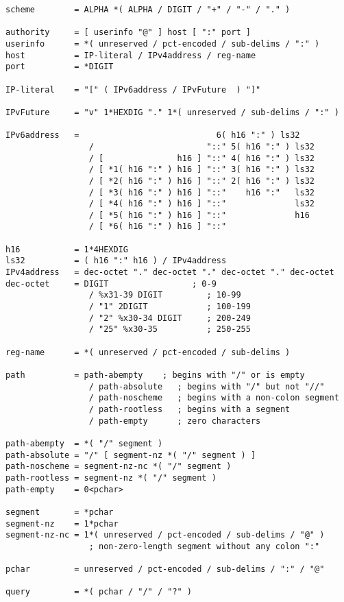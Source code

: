 \begin{verbatim}
scheme        = ALPHA *( ALPHA / DIGIT / "+" / "-" / "." )

authority     = [ userinfo "@" ] host [ ":" port ]
userinfo      = *( unreserved / pct-encoded / sub-delims / ":" )
host          = IP-literal / IPv4address / reg-name
port          = *DIGIT

IP-literal    = "[" ( IPv6address / IPvFuture  ) "]"

IPvFuture     = "v" 1*HEXDIG "." 1*( unreserved / sub-delims / ":" )

IPv6address   =                            6( h16 ":" ) ls32
                 /                       "::" 5( h16 ":" ) ls32
                 / [               h16 ] "::" 4( h16 ":" ) ls32
                 / [ *1( h16 ":" ) h16 ] "::" 3( h16 ":" ) ls32
                 / [ *2( h16 ":" ) h16 ] "::" 2( h16 ":" ) ls32
                 / [ *3( h16 ":" ) h16 ] "::"    h16 ":"   ls32
                 / [ *4( h16 ":" ) h16 ] "::"              ls32
                 / [ *5( h16 ":" ) h16 ] "::"              h16
                 / [ *6( h16 ":" ) h16 ] "::"

h16           = 1*4HEXDIG
ls32          = ( h16 ":" h16 ) / IPv4address
IPv4address   = dec-octet "." dec-octet "." dec-octet "." dec-octet
dec-octet     = DIGIT                 ; 0-9
                 / %x31-39 DIGIT         ; 10-99
                 / "1" 2DIGIT            ; 100-199
                 / "2" %x30-34 DIGIT     ; 200-249
                 / "25" %x30-35          ; 250-255

reg-name      = *( unreserved / pct-encoded / sub-delims )

path          = path-abempty    ; begins with "/" or is empty
                 / path-absolute   ; begins with "/" but not "//"
                 / path-noscheme   ; begins with a non-colon segment
                 / path-rootless   ; begins with a segment
                 / path-empty      ; zero characters

path-abempty  = *( "/" segment )
path-absolute = "/" [ segment-nz *( "/" segment ) ]
path-noscheme = segment-nz-nc *( "/" segment )
path-rootless = segment-nz *( "/" segment )
path-empty    = 0<pchar>

segment       = *pchar
segment-nz    = 1*pchar
segment-nz-nc = 1*( unreserved / pct-encoded / sub-delims / "@" )
                 ; non-zero-length segment without any colon ":"

pchar         = unreserved / pct-encoded / sub-delims / ":" / "@"

query         = *( pchar / "/" / "?" )


\end{verbatim}
